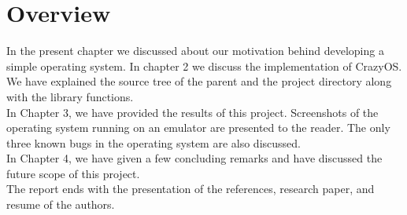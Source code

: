 \section{Overview}
In the present chapter we discussed about our motivation behind developing a simple operating system. In chapter 2 we discuss the implementation of CrazyOS. We have explained the source tree of the parent and the project directory along with the library functions.\\
In Chapter 3, we have provided the results of this project. Screenshots of the operating system running on an emulator are presented to the reader. The only three known bugs in the operating system are also discussed.\\
In Chapter 4, we have given a few concluding remarks and have discussed the future scope of this project.\\
The report ends with the presentation of the references, research paper, and resume of the authors.      